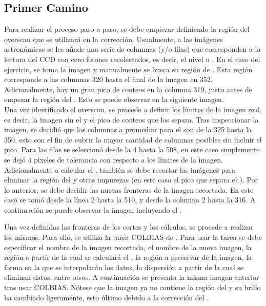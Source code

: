 \documentclass[12pt]{article}
\begin{document}
\subsection{Primer Camino}
Para realizar el proceso paso a paso, se debe empiezar definiendo la región del overscan que se utilizará en la corrección. Usualmente, a las imágenes astronómicas se les añade una serie de columnas (y/o filas) que corresponden a la lectura del CCD con cero fotones recolectados, es decir, el nivel  u \cite{handbookCCD}. En el caso del ejercicio, se toma la imagen  y manualmente se busca su región de  . Esta región corresponde a las columnas 320 hasta el final de la imagen en 352. Adicionalmente, hay un gran pico de conteos en la columna 319, justo antes de empezar la región del  . Esto se puede observar en la siguiente imagen. \\




Una vez identificado el overscan, se procede a definir los límites de la imagen real, es decir, la imagen sin el   y el pico de conteos que los separa. Tras inspeccionar la imagen, se decidió que las columnas a promediar para el  son de la 325 hasta la 350, esto con el fin de cubrir la mayor cantidad de columnas posibles sin incluir el pico. Para las filas se seleccionó desde la 4 hasta la 508, en este caso simplemente se dejó 4 pixeles de tolerancia con respecto a los límites de la imagen.\\

Adicionalmente a calcular el , también se debe recortar las imágenes para eliminar la región del   y otras impurezas (en este caso el pico que separa el ). Por lo anterior, se debe decidir las nuevas fronteras de la imagen recortada. En este caso se tomó desde la línea 2 hasta la 510, y desde la columna 2 hasta la 316. A continuación se puede observar la imagen incluyendo el  .


Una vez definidas las fronteras de los cortes y los cálculos, se procede a realizar los mismos. Para ello, se utiliza la tarea COLBIAS de  . Para usar la tarea se debe especificar el nombre de la imagen recortada, el nombre de la nueva imagen, la región a partir de la cual se calculará el , la región a preservar de la imagen, la forma en la que se interpolarán los datos, la dispersión a partir de la cual se eliminan datos, entre otros. A continuación se presenta la misma imagen anterior tras usar COLBIAS. Nótese que la imagen ya no contiene la región del  y su brillo ha cambiado ligeramente, esto último debido a la corrección del .
\end{document}
